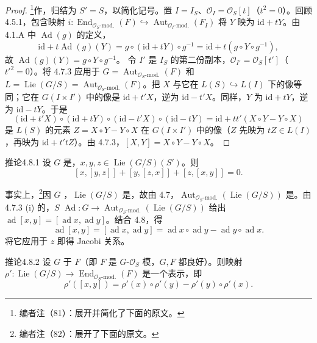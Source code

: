 \begin{proof}
\footnote{编者注（81）：展开并简化了下面的原文。}作，归结为 $S'=S$，以简化记号。置 $I=I_S$、$\mathcal O_I=\mathcal O_S[t]$（$t^2=0$）。回顾 4.5.1，包含映射 $i:\operatorname{End}_{\mathcal O_S\text{-mod.}}(F)\hookrightarrow\operatorname{Aut}_{\mathcal O_I\text{-mod.}}(F_I)$ 将 $Y$ 映为 $\mathrm{id}+tY$。由 4.1.A 中 $\operatorname{Ad}(g)$ 的定义，
\[\mathrm{id}+t\operatorname{Ad}(g)(Y)=g\circ(\mathrm{id}+tY)\circ g^{-1}=\mathrm{id}+t(g\circ Y\circ g^{-1}),\]
故 $\operatorname{Ad}(g)(Y)=g\circ Y\circ g^{-1}$。
令 $I'$ 是 $I_S$ 的第二份副本，$\mathcal O_{I'}=\mathcal O_S[t']$（$t'^2=0$）。将 4.7.3 应用于 $G=\operatorname{Aut}_{\mathcal O_S\text{-mod.}}(F)$ 和 $L=\operatorname{Lie}(G/S)=\operatorname{Aut}_{\mathcal O_S\text{-mod.}}(F)$。把 $X$ 与它在 $L(S)\hookrightarrow L(I)$ 下的像等同；它在 $G(I\times I')$ 中的像是 $\mathrm{id}+t'X$，逆为 $\mathrm{id}-t'X$。同样，$Y$ 为 $\mathrm{id}+tY$，逆为 $\mathrm{id}-tY$。于是
\[(\mathrm{id}+t'X)\circ(\mathrm{id}+tY)\circ(\mathrm{id}-t'X)\circ(\mathrm{id}-tY)=\mathrm{id}+tt'(X\circ Y-Y\circ X)\]
是 $L(S)$ 的元素 $Z=X\circ Y-Y\circ X$ 在 $G(I\times I')$ 中的像（$Z$ 先映为 $tZ\in L(I)$，再映为 $\mathrm{id}+t'tZ$）。由 4.7.3，$[X,Y]=X\circ Y-Y\circ X$。
\end{proof}
\begin{SGAresult}{推论}{4.8.1}
设 $G$ 是，$x,y,z\in\operatorname{Lie}(G/S)(S')$。则
\[[x,[y,z]]+[y,[z,x]]+[z,[x,y]]=0.\]
\end{SGAresult}
事实上，\footnote{编者注（82）：展开了下面的原文。}因 $G$ ，$\operatorname{Lie}(G/S)$ 是，故由 4.7，$\operatorname{Aut}_{\mathcal O_S\text{-mod.}}(\operatorname{Lie}(G/S))$ 是。由 4.7.3 (i) 的，$S$  $\operatorname{Ad}:G\to\operatorname{Aut}_{\mathcal O_S\text{-mod.}}(\operatorname{Lie}(G/S))$ 给出 $\operatorname{ad}[x,y]=[\operatorname{ad}x,\operatorname{ad}y]$。结合 4.8，得
\[\operatorname{ad}[x,y]=[\operatorname{ad}x,\operatorname{ad}y]=\operatorname{ad}x\circ\operatorname{ad}y-\operatorname{ad}y\circ\operatorname{ad}x.\]
将它应用于 $z$ 即得 Jacobi 关系。
\begin{SGAresult}{推论}{4.8.2}
设 $G$ 于 $F$（即 $F$ 是 $G$-$\mathcal O_S$ 模，$G,F$ 都良好）。则映射 $\rho':\operatorname{Lie}(G/S)\to\operatorname{End}_{\mathcal O_S\text{-mod.}}(F)$ 是一个表示，即
\[\rho'([x,y])=\rho'(x)\circ\rho'(y)-\rho'(y)\circ\rho'(x).\]
\end{SGAresult}
